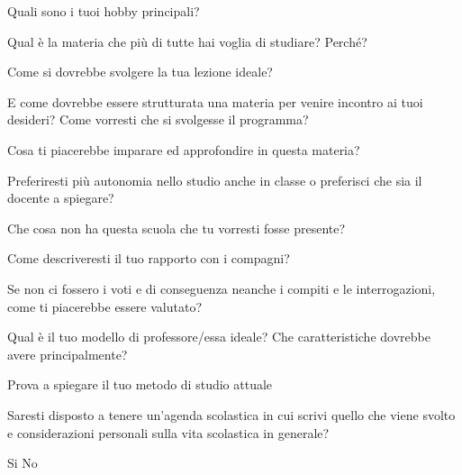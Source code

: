 \documentclass[addpoints]{exam}
\begin{document}
 
\vspace{5mm}


\vspace{5mm}

\begin{questions}
	\question Quali sono i tuoi hobby principali?
	\fillwithlines{1in}
	
	\question Qual è la materia che più di tutte hai voglia di studiare? Perché?
	\fillwithlines{1in}
	
	\question Come si dovrebbe svolgere la tua lezione ideale?
	\fillwithlines{1in}
	
	\question E come dovrebbe essere strutturata una materia per venire incontro ai tuoi desideri? Come vorresti che si svolgesse il programma?
	\fillwithlines{2in}
	
	\question Cosa ti piacerebbe imparare ed approfondire in questa materia?
	\fillwithlines{1in}
	
	\question Preferiresti più autonomia nello studio anche in classe o preferisci che sia il docente a spiegare?
	\fillwithlines{1in}

	\question Che cosa non ha questa scuola che tu vorresti fosse presente?
	\fillwithlines{2in}
	
	\question Come descriveresti il tuo rapporto con i compagni?
	\fillwithlines{1in}
	
	\question Se non ci fossero i voti e di conseguenza neanche i compiti e le interrogazioni, come ti piacerebbe essere valutato?
	\fillwithlines{2in}
	
	\question Qual è il tuo modello di professore/essa ideale? Che caratteristiche dovrebbe avere principalmente?
	\fillwithlines{1in}
	
	\question Prova a spiegare il tuo metodo di studio attuale
	\fillwithlines{2in}
	
	\question Saresti disposto a tenere un'agenda scolastica in cui scrivi quello che viene svolto e considerazioni personali sulla vita scolastica in generale?
	\begin{oneparcheckboxes} \choice Si \choice No \end{oneparcheckboxes}
\end{questions}
\end{document}

